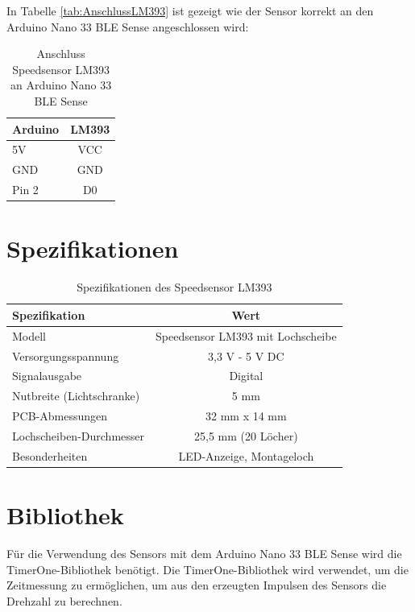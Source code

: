 In Tabelle \autoref{tab:AnschlussLM393} ist gezeigt wie der Sensor korrekt an den Arduino Nano 33 BLE Sense angeschlossen wird:

\begin{table}[htpb]
	\centering
	\begin{tabular}{|l|c|}
		\hline
		\textbf{Arduino} & \textbf{LM393} \\
		\hline
		5V & VCC \\
		GND & GND \\
		Pin 2 & D0 \\
		\hline
	\end{tabular}
	\caption{Anschluss Speedsensor LM393 an Arduino Nano 33 BLE Sense \cite{LM393.3}}
	\label{tab:AnschlussLM393}
\end{table}


\section{Spezifikationen}

\begin{table}[htpb]
	\centering
	\begin{tabular}{|l|c|}
		\hline
		\textbf{Spezifikation} & \textbf{Wert} \\
		\hline
		Modell & Speedsensor LM393 mit Lochscheibe \\
		Versorgungsspannung & 3,3 V - 5 V DC \\
		Signalausgabe & Digital \\
		Nutbreite (Lichtschranke) & 5 mm \\
		PCB-Abmessungen & 32 mm x 14 mm \\
		Lochscheiben-Durchmesser & 25,5 mm (20 Löcher) \\
		Besonderheiten & LED-Anzeige, Montageloch \\
		\hline
	\end{tabular}
	\caption{Spezifikationen des Speedsensor LM393 \cite{LM393.2}}
	\label{tab:SpezifikationLM393}
\end{table}

\section{Bibliothek}

Für die Verwendung des Sensors mit dem Arduino Nano 33 BLE Sense wird die TimerOne-Bibliothek benötigt. Die TimerOne-Bibliothek wird verwendet, um die Zeitmessung zu ermöglichen, um aus den erzeugten Impulsen des Sensors die Drehzahl zu berechnen.

